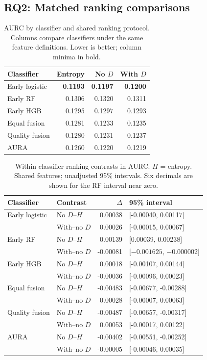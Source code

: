 \documentclass[conference]{IEEEtran}
\begin{document}
\subsection{RQ2: Matched ranking comparisons}
\begin{table}[t]
\caption{AURC by classifier and shared ranking protocol. Columns compare classifiers under the same feature definitions. Lower is better; column minima in bold.}
\label{tab:rank}
\centering\footnotesize
\begin{tabular}{@{}lrrr@{}}\toprule
Classifier & Entropy & No $D$ & With $D$\\\midrule
Early logistic & \textbf{0.1193} & \textbf{0.1197} & \textbf{0.1200}\\
Early RF & 0.1306 & 0.1320 & 0.1311\\
Early HGB & 0.1295 & 0.1297 & 0.1293\\
Equal fusion & 0.1281 & 0.1233 & 0.1235\\
Quality fusion & 0.1280 & 0.1231 & 0.1237\\
AURA & 0.1260 & 0.1220 & 0.1219\\\bottomrule
\end{tabular}
\end{table}
\begin{table}[t]
\caption{Within-classifier ranking contrasts in AURC. $H$ = entropy. Shared features; unadjusted 95\% intervals. Six decimals are shown for the RF interval near zero.}
\label{tab:rankci}
\centering\footnotesize
\begin{tabular}{@{}llrl@{}}\toprule
Classifier & Contrast & $\Delta$ & 95\% interval\\\midrule
Early logistic & No $D$--$H$ & 0.00038 & [-0.00040, 0.00117]\\
 & With--no $D$ & 0.00026 & [-0.00015, 0.00067]\\
Early RF & No $D$--$H$ & 0.00139 & [0.00039, 0.00238]\\
 & With--no $D$ & -0.00081 & [$-0.001625$, $-0.000002$]\\
Early HGB & No $D$--$H$ & 0.00018 & [-0.00107, 0.00144]\\
 & With--no $D$ & -0.00036 & [-0.00096, 0.00023]\\
Equal fusion & No $D$--$H$ & -0.00483 & [-0.00677, -0.00288]\\
 & With--no $D$ & 0.00028 & [-0.00007, 0.00063]\\
Quality fusion & No $D$--$H$ & -0.00487 & [-0.00657, -0.00317]\\
 & With--no $D$ & 0.00053 & [-0.00017, 0.00122]\\
AURA & No $D$--$H$ & -0.00402 & [-0.00551, -0.00252]\\
 & With--no $D$ & -0.00005 & [-0.00046, 0.00035]\\\bottomrule
\end{tabular}
\end{table}
\end{document}
